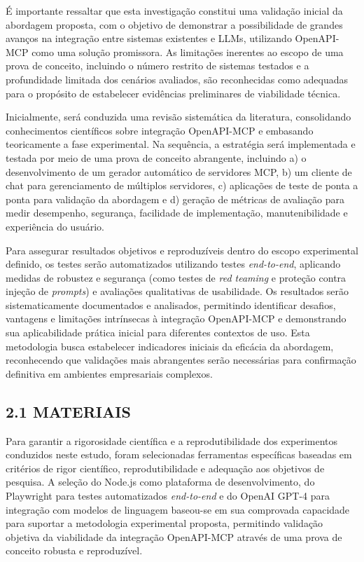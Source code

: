\documentclass[
]{article}
\begin{document}
É importante ressaltar que esta investigação constitui uma validação
inicial da abordagem proposta, com o objetivo de demonstrar a
possibilidade de grandes avanços na integração entre sistemas existentes
e LLMs, utilizando OpenAPI-MCP como uma solução promissora. As
limitações inerentes ao escopo de uma prova de conceito, incluindo o
número restrito de sistemas testados e a profundidade limitada dos
cenários avaliados, são reconhecidas como adequadas para o propósito de
estabelecer evidências preliminares de viabilidade técnica.

Inicialmente, será conduzida uma revisão sistemática da literatura,
consolidando conhecimentos científicos sobre integração OpenAPI-MCP e
embasando teoricamente a fase experimental. Na sequência, a estratégia
será implementada e testada por meio de uma prova de conceito
abrangente, incluindo a) o desenvolvimento de um gerador automático de
servidores MCP, b) um cliente de chat para gerenciamento de múltiplos
servidores, c) aplicações de teste de ponta a ponta para validação da
abordagem e d) geração de métricas de avaliação para medir desempenho,
segurança, facilidade de implementação, manutenibilidade e experiência
do usuário.

Para assegurar resultados objetivos e reproduzíveis dentro do escopo
experimental definido, os testes serão automatizados utilizando testes
\emph{end-to-end}, aplicando medidas de robustez e segurança (como
testes de \emph{red teaming} e proteção contra injeção de
\emph{prompts}) e avaliações qualitativas de usabilidade. Os resultados
serão sistematicamente documentados e analisados, permitindo identificar
desafios, vantagens e limitações intrínsecas à integração OpenAPI-MCP e
demonstrando sua aplicabilidade prática inicial para diferentes
contextos de uso. Esta metodologia busca estabelecer indicadores
iniciais da eficácia da abordagem, reconhecendo que validações mais
abrangentes serão necessárias para confirmação definitiva em ambientes
empresariais complexos.

\subsection{2.1 MATERIAIS}\label{materiais}

Para garantir a rigorosidade científica e a reprodutibilidade dos
experimentos conduzidos neste estudo, foram selecionadas ferramentas
específicas baseadas em critérios de rigor científico, reprodutibilidade
e adequação aos objetivos de pesquisa. A seleção do Node.js como
plataforma de desenvolvimento, do Playwright para testes automatizados
\emph{end-to-end} e do OpenAI GPT-4 para integração com modelos de
linguagem baseou-se em sua comprovada capacidade para suportar a
metodologia experimental proposta, permitindo validação objetiva da
viabilidade da integração OpenAPI-MCP através de uma prova de conceito
robusta e reproduzível.
\end{document}
